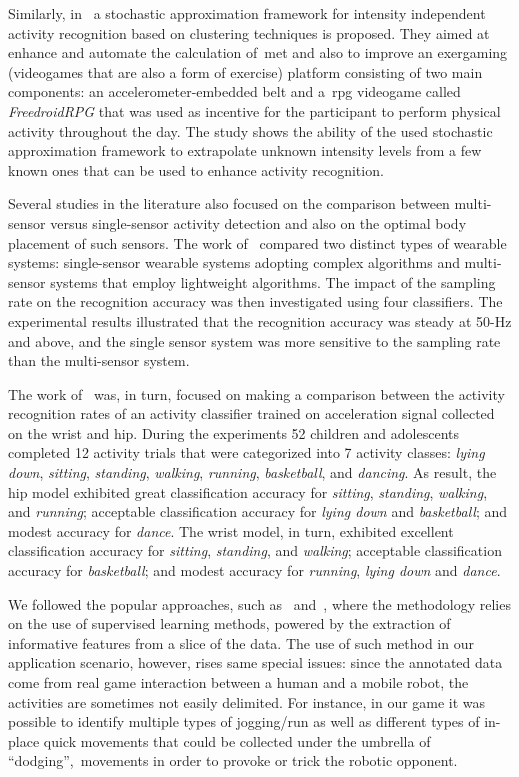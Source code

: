 Similarly, in~\cite{alshurafa_designing_2014} a stochastic approximation framework for intensity independent activity recognition based on clustering techniques is proposed. They aimed at enhance and automate the calculation of~\gls{met} and also to improve an exergaming (videogames that are also a form of exercise) platform consisting of two main components: an accelerometer-embedded belt and a~\gls{rpg} videogame called \textit{FreedroidRPG} that was used as incentive for the participant to perform physical activity throughout the day. The study shows the ability of the used stochastic approximation framework to extrapolate unknown intensity levels from a few known ones that can be used to enhance activity recognition.

Several studies in the literature also focused on the comparison between multi-sensor versus single-sensor activity detection and also on the optimal body placement of such sensors. The work of~\cite{gao_evaluation_2014} compared two distinct types of wearable systems: single-sensor wearable systems adopting complex algorithms and multi-sensor systems that employ lightweight algorithms. The impact of the sampling rate on the recognition accuracy was then investigated using four classifiers. The experimental results illustrated that the recognition accuracy was steady at 50-Hz and above, and the single sensor system was more sensitive to the sampling rate than the multi-sensor system.

The work of~\cite{trost_machine_2014} was, in turn, focused on making a comparison between the activity recognition rates of an activity classifier trained on acceleration signal collected on the wrist and hip. During the experiments 52 children and adolescents completed 12 activity trials that were categorized into 7 activity classes: \textit{lying down}, \textit{sitting}, \textit{standing}, \textit{walking}, \textit{running}, \textit{basketball}, and \textit{dancing}. As result, the hip model exhibited great classification accuracy for \textit{sitting}, \textit{standing}, \textit{walking}, and \textit{running}; acceptable classification accuracy for \textit{lying down} and \textit{basketball}; and modest accuracy for \textit{dance}. The wrist model, in turn, exhibited excellent classification accuracy for \textit{sitting}, \textit{standing}, and \textit{walking}; acceptable classification accuracy for \textit{basketball}; and modest accuracy for \textit{running}, \textit{lying down} and \textit{dance}.

We followed the popular approaches, such as~\cite{ravi_activity_2005} and~\cite{bao_activity_2004}, where the methodology relies on the use of supervised learning methods, powered by the extraction of informative features from a slice of the data. The use of such method in our application scenario, however, rises same special issues: since the annotated data come from real game interaction between a human and a mobile robot, the activities are sometimes not easily delimited. For instance, in our game it was possible to identify multiple types of jogging/run as well as different types of in-place quick movements that could be collected under the umbrella of ``dodging'',~\ie movements in order to provoke or trick the robotic opponent. 

